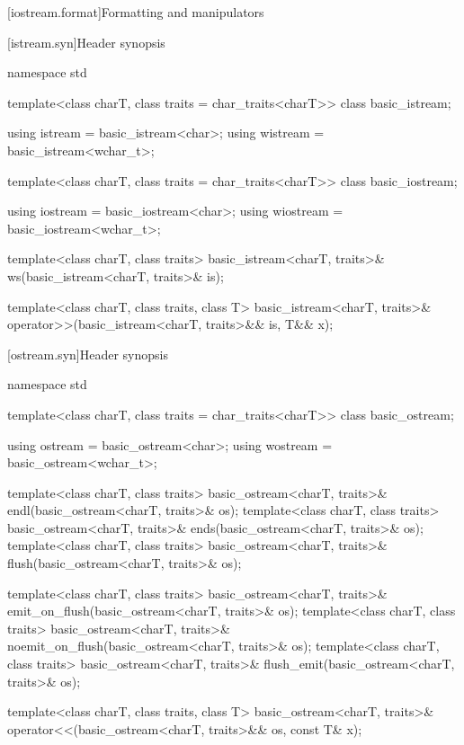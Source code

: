 [iostream.format]{Formatting and manipulators}

[istream.syn]{Header  synopsis}

%
\begin{codeblock}
namespace std {
  template<class charT, class traits = char_traits<charT>>
    class basic_istream;

  using istream  = basic_istream<char>;
  using wistream = basic_istream<wchar_t>;

  template<class charT, class traits = char_traits<charT>>
    class basic_iostream;

  using iostream  = basic_iostream<char>;
  using wiostream = basic_iostream<wchar_t>;

  template<class charT, class traits>
    basic_istream<charT, traits>& ws(basic_istream<charT, traits>& is);

  template<class charT, class traits, class T>
    basic_istream<charT, traits>& operator>>(basic_istream<charT, traits>&& is, T&& x);
}
\end{codeblock}

%
%
%
%

[ostream.syn]{Header  synopsis}

%
\begin{codeblock}
namespace std {
  template<class charT, class traits = char_traits<charT>>
    class basic_ostream;

  using ostream  = basic_ostream<char>;
  using wostream = basic_ostream<wchar_t>;

  template<class charT, class traits>
    basic_ostream<charT, traits>& endl(basic_ostream<charT, traits>& os);
  template<class charT, class traits>
    basic_ostream<charT, traits>& ends(basic_ostream<charT, traits>& os);
  template<class charT, class traits>
    basic_ostream<charT, traits>& flush(basic_ostream<charT, traits>& os);

  template<class charT, class traits>
    basic_ostream<charT, traits>& emit_on_flush(basic_ostream<charT, traits>& os);
  template<class charT, class traits>
    basic_ostream<charT, traits>& noemit_on_flush(basic_ostream<charT, traits>& os);
  template<class charT, class traits>
    basic_ostream<charT, traits>& flush_emit(basic_ostream<charT, traits>& os);

  template<class charT, class traits, class T>
    basic_ostream<charT, traits>& operator<<(basic_ostream<charT, traits>&& os, const T& x);
}
\end{codeblock}

